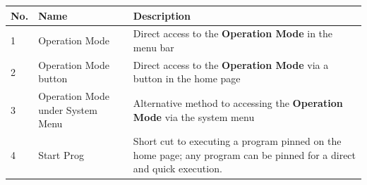 \begin{longtable}[]{@{}lll@{}}
\toprule
\begin{minipage}[b]{0.04\columnwidth}\raggedright
No.\strut
\end{minipage} & \begin{minipage}[b]{0.23\columnwidth}\raggedright
Name\strut
\end{minipage} & \begin{minipage}[b]{0.65\columnwidth}\raggedright
Description\strut
\end{minipage}\tabularnewline
\midrule
\endhead
\begin{minipage}[t]{0.04\columnwidth}\raggedright
1\strut
\end{minipage} & \begin{minipage}[t]{0.23\columnwidth}\raggedright
Operation Mode\strut
\end{minipage} & \begin{minipage}[t]{0.65\columnwidth}\raggedright
Direct access to the \textbf{Operation Mode} in the menu bar\strut
\end{minipage}\tabularnewline
\begin{minipage}[t]{0.04\columnwidth}\raggedright
2\strut
\end{minipage} & \begin{minipage}[t]{0.23\columnwidth}\raggedright
Operation Mode button\strut
\end{minipage} & \begin{minipage}[t]{0.65\columnwidth}\raggedright
Direct access to the \textbf{Operation Mode} via a button in the home
page\strut
\end{minipage}\tabularnewline
\begin{minipage}[t]{0.04\columnwidth}\raggedright
3\strut
\end{minipage} & \begin{minipage}[t]{0.23\columnwidth}\raggedright
Operation Mode under System Menu\strut
\end{minipage} & \begin{minipage}[t]{0.65\columnwidth}\raggedright
Alternative method to accessing the \textbf{Operation Mode} via the
system menu\strut
\end{minipage}\tabularnewline
\begin{minipage}[t]{0.04\columnwidth}\raggedright
4\strut
\end{minipage} & \begin{minipage}[t]{0.23\columnwidth}\raggedright
Start Prog\strut
\end{minipage} & \begin{minipage}[t]{0.65\columnwidth}\raggedright
Short cut to executing a program pinned on the home page; any program
can be pinned for a direct and quick execution.\strut
\end{minipage}\tabularnewline
\bottomrule
\end{longtable}

